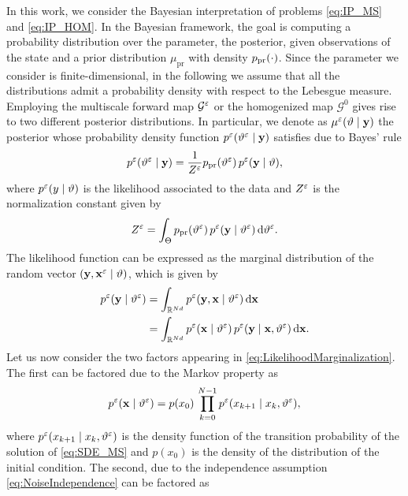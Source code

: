 \documentclass[10pt]{article}
\begin{document}
In this work, we consider the Bayesian interpretation of problems \eqref{eq:IP_MS} and \eqref{eq:IP_HOM}. In the Bayesian framework, the goal is computing a probability distribution over the parameter, the posterior, given observations of the state and a prior distribution $\mu_{\mathrm{pr}}$ with density $p_{\mathrm{pr}}(\cdot)$. Since the parameter we consider is finite-dimensional, in the following we assume that all the distributions admit a probability density with respect to the Lebesgue measure. Employing the multiscale forward map $\mathcal G^\varepsilon$ or the homogenized map $\mathcal G^0$ gives rise to two different posterior distributions. In particular, we denote as $\mu^\varepsilon(\vartheta \mid \mathbf y)$ the posterior whose probability density function $p^\varepsilon(\vartheta^\varepsilon \mid \mathbf y)$ satisfies due to Bayes' rule
\begin{equation}
	p^\varepsilon(\vartheta^\varepsilon \mid \mathbf y) = \frac{1}{Z^\varepsilon} p_{\mathrm{pr}}(\vartheta^\varepsilon) \, p^\varepsilon(\mathbf y \mid \vartheta),
\end{equation} 
where $p^\varepsilon(y \mid \vartheta)$ is the likelihood associated to the data and $Z^\varepsilon$ is the normalization constant given by
\begin{equation}
	Z^\varepsilon = \int_{\Theta} p_{\mathrm{pr}}(\vartheta^\varepsilon) \, p^\varepsilon(\mathbf y \mid \vartheta^\varepsilon) \,\mathrm{d} \vartheta^\varepsilon.
\end{equation}
The likelihood function can be expressed as the marginal distribution of the random vector $(\mathbf y, \mathbf x^\varepsilon \mid \vartheta)$, which is given by
\begin{equation}\label{eq:LikelihoodMarginalization}
\begin{aligned}
	p^\varepsilon(\mathbf y \mid \vartheta^\varepsilon) &= \int_{\mathbb{R}^{Nd}} p^\varepsilon(\mathbf y, \mathbf x \mid \vartheta^\varepsilon) \,\mathrm{d} \mathbf x\\
	&= \int_{\mathbb{R}^{Nd}} p^\varepsilon(\mathbf x \mid \vartheta^\varepsilon) \, p^\varepsilon(\mathbf y \mid \mathbf x, \vartheta^\varepsilon) \,\mathrm{d} \mathbf x.
\end{aligned}
\end{equation}
Let us now consider the two factors appearing in \eqref{eq:LikelihoodMarginalization}. The first can be factored due to the Markov property as
\begin{equation}
	p^\varepsilon(\mathbf x \mid \vartheta^\varepsilon) = p(x_0) \, \prod_{k=0}^{N-1} p^\varepsilon(x_{k+1} \mid x_k, \vartheta^\varepsilon),
\end{equation}
where $p^\varepsilon(x_{k+1} \mid x_k, \vartheta^\varepsilon)$ is the density function of the transition probability of the solution of \eqref{eq:SDE_MS} and $p(x_0)$ is the density of the distribution of the initial condition. The second, due to the independence assumption \eqref{eq:NoiseIndependence} can be factored as
\end{document}
